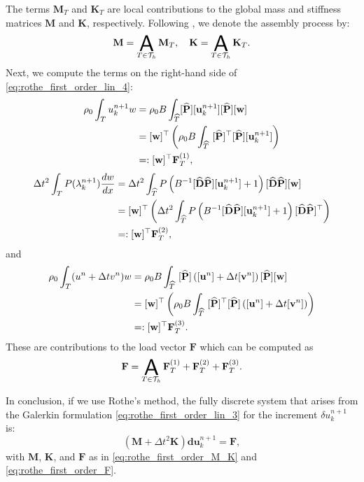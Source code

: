 \documentclass{sfuthesis}
\numberwithin{equation}{section}
\numberwithin{figure}{chapter}
\numberwithin{table}{chapter}
\theoremstyle{definition}
\def\*#1{{\mathbf{#1}}} %
\newcommand{\der}[2]{\dfrac{d #1}{d #2}}
\DeclareMathOperator*{\assembly}{\scalerel*{\mathsf{A}}{\sum}}
\begin{document}
The terms $\*M_T$ and $\*K_T$ are local contributions to the global mass and stiffness matrices $\*M$ and $\*K$, respectively. Following \cite{HughesBook}, we denote the assembly process by:
\begin{equation} \label{eq:rothe_first_order_M_K}
    \*M = \assembly_{T\in\mathcal{T}_h} \*M_T, \quad \*K = \assembly_{T \in \mathcal{T}_h} \*K_T.
\end{equation}
Next, we compute the terms on the right-hand side of \eqref{eq:rothe_first_order_lin_4}:
\begin{align}
    \rho_0 \int_T u_{k}^{n+1} w 
    \notag &= \rho_0 B \int_{\widehat{T}} [\widehat{\*P}] [\*u_k^{n+1}] [\widehat{\*P}][\*w] \\
    \notag &= [\*w]^\top \left( \rho_0 B \int_{\widehat{T}} \ [\widehat{\*P}]^\top [\widehat{\*P}] [\*u_k^{n+1}] \right) \\
    &=: [\*w]^\top \*F^{(1)}_T,
\end{align}
\begin{align}
    \Delta t^2 \int_T P(\lambda_{k}^{n+1}) \der{w}{x} 
    \notag &= \Delta t^2 \int_{\widehat{T}} P\left( B^{-1} [\widehat{\*D} \widehat{\*P}] [\*u_k^{n+1}] + 1 \right) [\widehat{\*D}\widehat{\*P}] [\*w] \\
    &= [\*w]^\top \left( \Delta t^2 \int_{\widehat{T}} P\left( B^{-1} [\widehat{\*D} \widehat{\*P}] [\*u_k^{n+1}] + 1 \right) [\widehat{\*D}\widehat{\*P}]^\top \right) \\
    &=: [\*w]^\top \*F^{(2)}_T,
\end{align}
and
\begin{align} \label{eq:rothe_first_order_lin_5}
    \rho_0 \int_T (u^n+\Delta t v^n) w 
    \notag &= \rho_0 B \int_{\widehat{T}} \ [\widehat{\*P}] \left([\*u^n] + \Delta t [\*v^n]\right) [\widehat{\*P}] [\*w] \\
    \notag &= [\*w]^\top \left(\rho_0 B \int_{\widehat{T}} \ [\widehat{\*P}]^\top [\widehat{\*P}] \left([\*u^n] + \Delta t [\*v^n]\right)  \right) \\
    &=: [\*w]^\top \*F^{(3)}_T.
\end{align}
These are contributions to the load vector $\*F$ which can be computed as
\begin{equation} \label{eq:rothe_first_order_F}
    \*F = \assembly_{T \in \mathcal{T}_h} \*F^{(1)}_T + \*F^{(2)}_T + \*F^{(3)}_T.
\end{equation}

In conclusion, if we use Rothe's method, the fully discrete system that arises from the Galerkin formulation \eqref{eq:rothe_first_order_lin_3} for the increment $\delta u_k^{n+1}$ is:
\begin{equation} \label{eq:rothe_first_order_linear}
    (\*M + \Delta t^2 \*K) \*d\*u_k^{n+1} = \*F,
\end{equation}
with $\*M$, $\*K$, and $\*F$ as in \eqref{eq:rothe_first_order_M_K} and \eqref{eq:rothe_first_order_F}.
\end{document}
